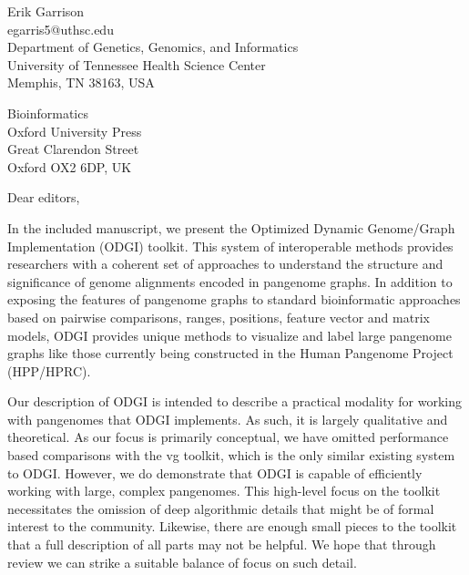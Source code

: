 \documentclass[12pt,hidelinks,letterpaper]{article}
\begin{document}
\begin{flushright}
  Erik Garrison \\
  egarris5@uthsc.edu \\
  Department of Genetics, Genomics, and Informatics \\
  University of Tennessee Health Science Center \\
  Memphis, TN 38163, USA
\end{flushright}


\begin{flushleft}
  Bioinformatics \\
  Oxford University Press \\
  Great Clarendon Street \\
  Oxford OX2 6DP, UK
\end{flushleft}


Dear editors,
\hfill \break

In the included manuscript, we present the Optimized Dynamic Genome/Graph Implementation (ODGI) toolkit.
This system of interoperable methods provides researchers with a coherent set of approaches to understand the structure and significance of genome alignments encoded in pangenome graphs.
In addition to exposing the features of pangenome graphs to standard bioinformatic approaches based on pairwise comparisons, ranges, positions, feature vector and matrix models, ODGI provides unique methods to visualize and label large pangenome graphs like those currently being constructed in the Human Pangenome Project (HPP/HPRC).

Our description of ODGI is intended to describe a practical modality for working with pangenomes that ODGI implements.
As such, it is largely qualitative and theoretical.
As our focus is primarily conceptual, we have omitted performance based comparisons with the vg toolkit, which is the only similar existing system to ODGI.
However, we do demonstrate that ODGI is capable of efficiently working with large, complex pangenomes.
This high-level focus on the toolkit necessitates the omission of deep algorithmic details that might be of formal interest to the community.
Likewise, there are enough small pieces to the toolkit that a full description of all parts may not be helpful.
We hope that through review we can strike a suitable balance of focus on such detail.
\end{document}
